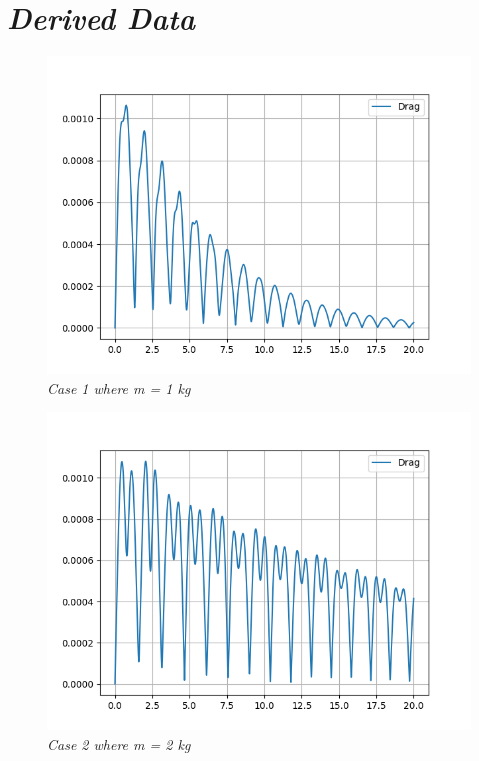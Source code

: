 \chapter{\textit{Derived Data}}\label{dvdata}
            
    \begin{figure}[H]
        \centering
        \includegraphics{Appendix/Derived Data Pictures/dm1.png}
        \caption{\textit{Case 1 where m = 1 kg}}
        \label{}
    \end{figure}
            
    \begin{figure}[H]
        \centering
        \includegraphics{Appendix/Derived Data Pictures/dm3.png}
        \caption{\textit{Case 2 where m = 2 kg}}
        \label{}
    \end{figure}
            
